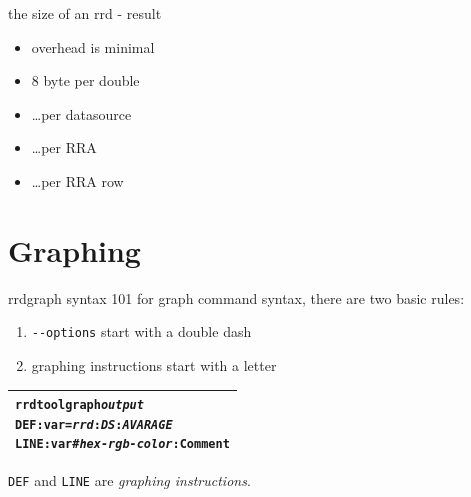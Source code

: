 
\begin{frame}{the size of an rrd - result}

\begin{itemize}[<+-| alert@+>]
\item overhead is minimal
\item 8 byte per double 
\item \ldots per datasource
\item \ldots per RRA
\item \ldots per RRA row
\end{itemize}
\end{frame}



\section{Graphing}
\begin{frame}[fragile]{rrdgraph syntax 101}
for graph command syntax, there are two basic rules:\pause
\begin{enumerate}
\item \texttt{-{}-options} start with a double dash\pause
\item graphing instructions start with a letter
\end{enumerate}

\pause
\begin{center}
\renewcommand{\tabcolsep}{0.4cm}
\renewcommand{\arraystretch}{2}

\begin{tabular}{|l|}\hline
\begin{minipage}[t]{0.7\textwidth}
\begin{alltt}
rrdtool graph \textit{output}
   DEF:var=\textit{rrd}:\textit{DS}:\textit{AVARAGE}
   LINE:var#\textit{hex-rgb-color}:Comment

\end{alltt}
\end{minipage}\\\hline
\end{tabular}
\end{center}

\texttt{DEF} and \texttt{LINE} are \emph{graphing instructions}.
\end{frame}

